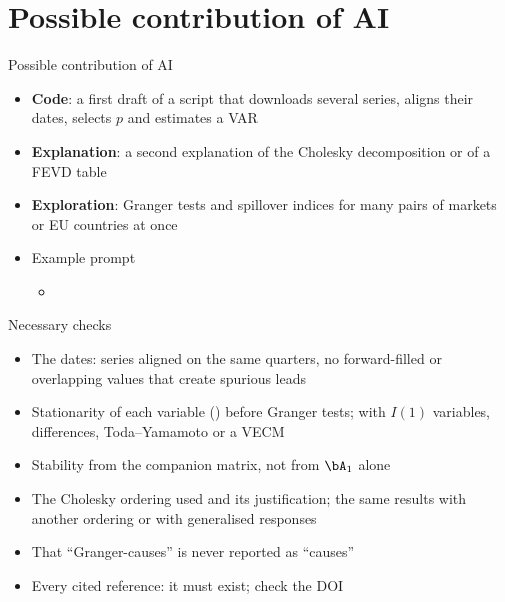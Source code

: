 \section{Possible contribution of AI}

\begin{frame}{Possible contribution of AI}
\itemsize{\small}
\begin{itemize}
    \item \textbf{Code}: a first draft of a script that downloads several series, aligns their dates, selects $p$ and estimates a VAR
    \item \textbf{Explanation}: a second explanation of the Cholesky decomposition or of a FEVD table
    \item \textbf{Exploration}: Granger tests and spillover indices for many pairs of markets or EU countries at once
    \item Example prompt
    \begin{itemize}
        \item {}
    \end{itemize}
\end{itemize}
\end{frame}

\begin{frame}{Necessary checks}
\itemsize{\small}
\begin{itemize}
    \item The dates: series aligned on the same quarters, no forward-filled or overlapping values that create spurious leads
    \item Stationarity of each variable () before Granger tests; with $I(1)$ variables, differences, Toda--Yamamoto or a VECM
    \item Stability from the companion matrix, not from $\bA_1$ alone
    \item The Cholesky ordering used and its justification; the same results with another ordering or with generalised responses
    \item That ``Granger-causes'' is never reported as ``causes''
    \item Every cited reference: it must exist; check the DOI
\end{itemize}
\end{frame}


